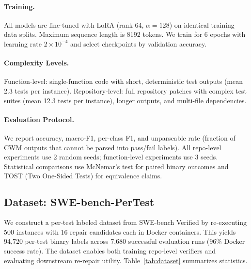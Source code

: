 \documentclass[11pt,a4paper]{article}
\begin{document}
\paragraph{Training.} All models are fine-tuned with LoRA (rank 64, $\alpha=128$) on identical training data splits. Maximum sequence length is 8192 tokens. We train for 6 epochs with learning rate $2\times10^{-4}$ and select checkpoints by validation accuracy.

\paragraph{Complexity Levels.} Function-level: single-function code with short, deterministic test outputs (mean 2.3 tests per instance). Repository-level: full repository patches with complex test suites (mean 12.3 tests per instance), longer outputs, and multi-file dependencies.

\paragraph{Evaluation Protocol.} We report accuracy, macro-F1, per-class F1, and unparseable rate (fraction of CWM outputs that cannot be parsed into pass/fail labels). All repo-level experiments use 2 random seeds; function-level experiments use 3 seeds. Statistical comparisons use McNemar's test for paired binary outcomes and TOST (Two One-Sided Tests) for equivalence claims.

\subsection{Dataset: SWE-bench-PerTest}

We construct a per-test labeled dataset from SWE-bench Verified by re-executing 500 instances with 16 repair candidates each in Docker containers. This yields 94,720 per-test binary labels across 7,680 successful evaluation runs (96\% Docker success rate). The dataset enables both training repo-level verifiers and evaluating downstream re-repair utility. Table~\ref{tab:dataset} summarizes statistics.
\end{document}
